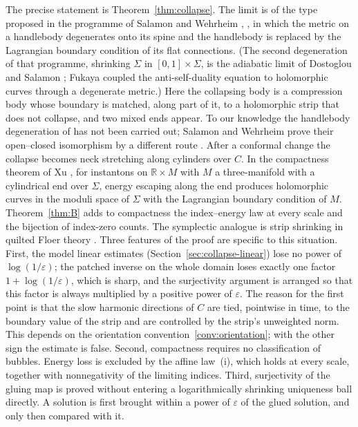 \documentclass[11pt]{amsart}
\theoremstyle{definition}
\theoremstyle{remark}
\theoremstyle{plain}
\numberwithin{equation}{section}
\newcommand{\RR}{\mathbb{R}}
\newcommand{\eps}{\varepsilon}
\begin{document}
The precise statement is Theorem~\ref{thm:collapse}. The limit is of the type
proposed in the programme of Salamon and Wehrheim \cite[Conjecture~3.4]{Salamon-ICM},
\cite[Section~4]{Wehrheim-lagrangian}, in which the metric on a handlebody
degenerates onto its spine and the handlebody is replaced by the Lagrangian boundary
condition of its flat connections. (The second degeneration of that programme,
shrinking $\Sigma$ in $[0,1]\times\Sigma$, is the adiabatic limit of Dostoglou and
Salamon \cite{DS}; Fukaya \cite{Fukaya-degenerate} coupled the anti-self-duality
equation to holomorphic curves through a degenerate metric.) Here the collapsing
body is a compression body whose boundary is matched, along part of it, to a
holomorphic strip that does not collapse, and two mixed ends appear. To our
knowledge the handlebody degeneration of \cite{Salamon-ICM, Wehrheim-lagrangian}
has not been carried out; Salamon and Wehrheim prove their open--closed
isomorphism by a different route \cite{SW-openclosed}. After a conformal change the
collapse becomes neck stretching along cylinders over $C$. In the compactness
theorem of Xu \cite[Theorem~1.4]{Xu}, for instantons on $\RR\times M$ with $M$ a
three-manifold with a cylindrical end over $\Sigma$, energy escaping along the end
produces holomorphic curves in the moduli space of $\Sigma$ with the Lagrangian
boundary condition of $M$. Theorem~\ref{thm:B} adds to compactness the
index--energy law at every scale and the bijection of index-zero counts. The
symplectic analogue is strip shrinking in quilted Floer theory
\cite{WW-composition, BW-squiggly}. Three features of
the proof are specific to this situation. First, the model linear
estimates (Section~\ref{sec:collapse-linear}) lose no power of
$\log(1/\eps)$; the patched inverse on the whole domain loses exactly one
factor $1+\log(1/\eps)$, which is sharp, and the surjectivity argument is arranged so that this factor is always
multiplied by a positive power of $\eps$. The reason for the first point is
that the slow harmonic directions of $C$
are tied, pointwise in time, to the boundary value of the strip and are
controlled by the strip's unweighted norm. This depends on the
orientation convention~\ref{conv:orientation}; with the other sign the
estimate is false. Second, compactness requires no classification of
bubbles. Energy loss is excluded by the affine law~(i), which holds at
every scale, together with nonnegativity of the limiting indices.
Third, surjectivity of the gluing map is proved without entering a logarithmically shrinking
uniqueness ball directly. A solution is first brought within a power of
$\eps$ of the glued solution, and only then compared with it.
\end{document}
